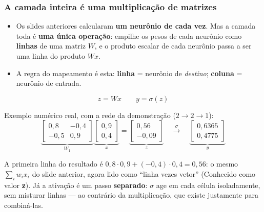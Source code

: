 \begin{frame}[shrink]
	\frametitle{A camada inteira é uma multiplicação de matrizes}
	\small
	\begin{itemize}
		\item Os slides anteriores calcularam \textbf{um neurônio de cada vez}. Mas a camada toda é \textbf{uma única operação}: empilhe os pesos de cada neurônio como \textbf{linhas} de uma matriz $W$, e o produto escalar de cada neurônio passa a ser uma linha do produto $Wx$.\newline
		
		\item A regra do mapeamento é esta: \newline \textbf{linha} = neurônio de \emph{destino}; \newline \textbf{coluna} = neurônio de entrada.
	\end{itemize}
	\begin{equation*}
		z = W x \qquad y = \sigma(z)
	\end{equation*}
	\par Exemplo numérico real, com a rede da demonstração ($2 \rightarrow 2 \rightarrow 1$):
	\begin{equation*}
		\underbrace{\begin{bmatrix} 0{,}8 & -0{,}4 \\ -0{,}5 & 0{,}9 \end{bmatrix}}_{W_1}
		\underbrace{\begin{bmatrix} 0{,}9 \\ 0{,}4 \end{bmatrix}}_{x}
		=
		\underbrace{\begin{bmatrix} 0{,}56 \\ -0{,}09 \end{bmatrix}}_{z}
		\quad\xrightarrow{\ \sigma\ }\quad
		\underbrace{\begin{bmatrix} 0{,}6365 \\ 0{,}4775 \end{bmatrix}}_{y}
	\end{equation*}
	\par A primeira linha do resultado é $0{,}8 \!\cdot\! 0{,}9 + (-0{,}4) \!\cdot\! 0{,}4 = 0{,}56$: o mesmo $\sum_i w_i x_i$ do slide anterior, agora lido como ``linha vezes vetor'' (Conhecido como valor \textbf{z}). Já a ativação é um passo \textbf{separado}: $\sigma$ age em cada célula isoladamente, sem misturar linhas --- ao contrário da multiplicação, que existe justamente para combiná-las.
\end{frame}
